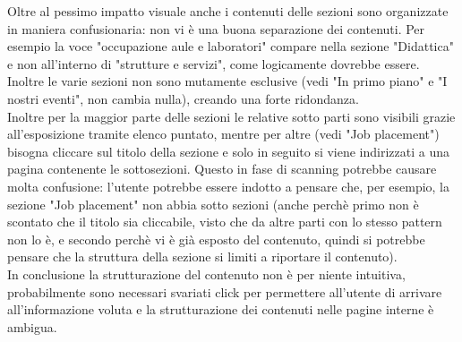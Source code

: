 
Oltre al pessimo impatto visuale anche i contenuti delle sezioni sono organizzate in maniera confusionaria: non vi è una buona separazione dei contenuti. Per esempio la voce "occupazione aule e laboratori" compare nella sezione "Didattica" e non all'interno di "strutture e servizi", come logicamente dovrebbe essere.\\
Inoltre le varie sezioni non sono mutamente esclusive (vedi "In primo piano" e "I nostri eventi", non cambia nulla), creando una forte ridondanza.\\
Inoltre per la maggior parte delle sezioni le relative sotto parti sono visibili grazie all'esposizione tramite elenco puntato, mentre per altre (vedi "Job placement") bisogna cliccare sul titolo della sezione e solo in seguito si viene indirizzati a una pagina contenente le sottosezioni. Questo in fase di scanning potrebbe causare molta confusione: l'utente potrebbe essere indotto a pensare che, per esempio, la sezione "Job placement" non abbia sotto sezioni (anche perchè primo non è scontato che il titolo sia cliccabile, visto che da altre parti con lo stesso pattern non lo è, e secondo perchè vi è già esposto del contenuto, quindi si potrebbe pensare che la struttura della sezione si limiti a riportare il contenuto). \\
In conclusione la strutturazione del contenuto non è per niente intuitiva, probabilmente sono necessari svariati click per permettere all'utente di arrivare all'informazione voluta e la strutturazione dei contenuti nelle pagine interne è ambigua.
